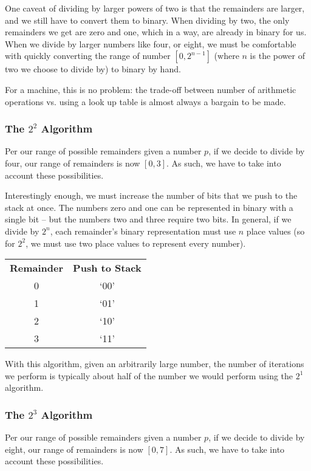\documentclass[12pt]{article}
\begin{document}
\par One caveat of dividing by larger powers of two is that the remainders are larger, and we still have to convert them to binary. When dividing by two, the only remainders we get are zero and one, which in a way, are already in binary for us. When we divide by larger numbers like four, or eight, we must be comfortable with quickly converting the range of number $[0,2^{n-1}]$ (where $n$ is the power of two we choose to divide by) to binary by hand.

\par For a machine, this is no problem: the trade-off between number of arithmetic operations vs. using a look up table is almost always a bargain to be made.

\subsubsection{The $2^2$ Algorithm}
Per our range of possible remainders given a number $p$, if we decide to divide by four, our range of remainders is now $[0,3]$. As such, we have to take into account these possibilities.

\par Interestingly enough, we must increase the number of bits that we push to the stack at once. The numbers zero and one can be represented in binary with a single bit -- but the numbers two and three require two bits. In general, if we divide by $2^n$, each remainder's binary representation must use $n$ place values (so for $2^2$, we must use two place values to represent every number).

\begin{center}
  \begin{tabular}{c|c}
    \textbf{Remainder} & \textbf{Push to Stack} \\
    0 & `00' \\
    1 & `01' \\
    2 & `10' \\
    3 & `11'
  \end{tabular}
\end{center}

\par With this algorithm, given an arbitrarily large number, the number of iterations we perform is typically about half of the number we would perform using the $2^1$ algorithm.

\subsubsection{The $2^3$ Algorithm}
Per our range of possible remainders given a number $p$, if we decide to divide by eight, our range of remainders is now $[0,7]$. As such, we have to take into account these possibilities.
\end{document}
